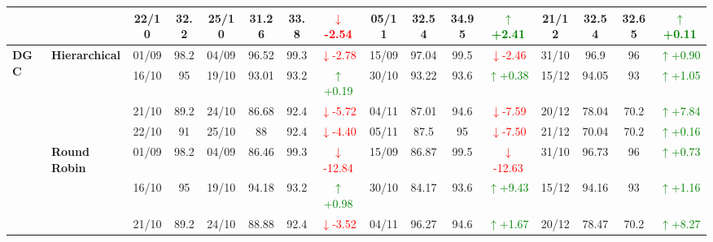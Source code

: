 \documentclass{ieeeaccess}
\begin{document}
{\begin{longtable}{llcc|cccc|cccc|cccc}
&
& 22/10 & 32.2 & 25/10 & 31.26 & 33.8 & \textcolor{red}{\(\downarrow\)-2.54} & 05/11 & 32.54 & 34.95 & \textcolor{green}{\(\uparrow\)+2.41} & 21/12 & 32.54 & 32.65 & \textcolor{green}{\(\uparrow\)+0.11} \\
\midrule




\multirow{12}{*}{\textbf{DGC}} 
& \textbf{Hierarchical}
& 01/09 & 98.2 & 04/09 & 96.52 & 99.3 & \textcolor{red}{\(\downarrow\)-2.78} & 15/09 & 97.04 & 99.5 & \textcolor{red}{\(\downarrow\)-2.46} & 31/10 & 96.9 & 96 & \textcolor{green}{\(\uparrow\)+0.90} \\

&
& 16/10 & 95 & 19/10 & 93.01 & 93.2 & \textcolor{green}{\(\uparrow\)+0.19} & 30/10 & 93.22 & 93.6 & \textcolor{green}{\(\uparrow\)+0.38} & 15/12 & 94.05 & 93 & \textcolor{green}{\(\uparrow\)+1.05} \\

&
& 21/10 & 89.2 & 24/10 & 86.68 & 92.4 & \textcolor{red}{\(\downarrow\)-5.72} & 04/11 & 87.01 & 94.6 & \textcolor{red}{\(\downarrow\)-7.59} & 20/12 & 78.04 & 70.2 & \textcolor{green}{\(\uparrow\)+7.84} \\

&
& 22/10 & 91 & 25/10 & 88 & 92.4 & \textcolor{red}{\(\downarrow\)-4.40} & 05/11 & 87.5 & 95 & \textcolor{red}{\(\downarrow\)-7.50} & 21/12 & 70.04 & 70.2 & \textcolor{green}{\(\uparrow\)+0.16} \\
\cmidrule(lr){2-16}


& \textbf{Round Robin}
& 01/09 & 98.2 & 04/09 & 86.46 & 99.3 & \textcolor{red}{\(\downarrow\)-12.84} & 15/09 & 86.87 & 99.5 & \textcolor{red}{\(\downarrow\)-12.63} & 31/10 & 96.73 & 96 & \textcolor{green}{\(\uparrow\)+0.73} \\

&
& 16/10 & 95 & 19/10 & 94.18 & 93.2 & \textcolor{green}{\(\uparrow\)+0.98} & 30/10 & 84.17 & 93.6 & \textcolor{green}{\(\uparrow\)+9.43} & 15/12 & 94.16 & 93 & \textcolor{green}{\(\uparrow\)+1.16} \\

&
& 21/10 & 89.2 & 24/10 & 88.88 & 92.4 & \textcolor{red}{\(\downarrow\)-3.52} & 04/11 & 96.27 & 94.6 & \textcolor{green}{\(\uparrow\)+1.67} & 20/12 & 78.47 & 70.2 & \textcolor{green}{\(\uparrow\)+8.27} \\


\end{longtable}}
\end{document}
